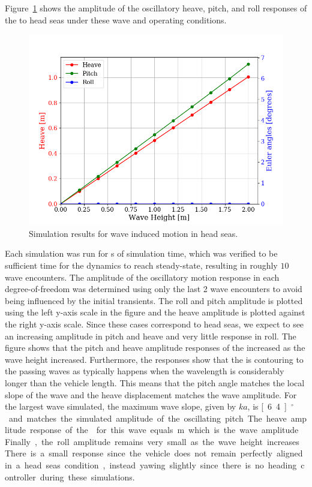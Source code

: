 \documentclass[utf8]{frontiersSCNS} %
\begin{document}
Figure~\ref{f:head_seas} shows the amplitude of the oscillatory heave, pitch, and roll responses of the \wamv{} to head seas under these wave and operating conditions.
\begin{figure}[h]
  \centering
  \includegraphics[width=\SFc\textwidth]{src/2020_08_25_head_seas_001.png}
  \caption{Simulation results for wave induced motion in head seas.}
  \label{f:head_seas}
\end{figure}
%
Each simulation was run for \unit[60]{s} of simulation time, which was verified to be sufficient time for the dynamics to reach steady-state, resulting in roughly $10$ wave encounters. The amplitude of the oscillatory motion response in each degree-of-freedom was determined using only the last 2 wave encounters to avoid being influenced by the initial transients. The roll and pitch amplitude is plotted using the left y-axis scale in the figure and the heave amplitude is plotted against the right y-axis scale. Since these cases correspond to head seas, we expect to see an increasing amplitude in pitch and heave and very little response in roll. The figure shows that the pitch and heave amplitude responses of the \wamv{} increased as the wave height increased. Furthermore, the responses show that the \wamv{} is contouring to the passing waves as typically happens when the wavelength is considerably longer than the vehicle length. This means that the pitch angle matches the local slope of the wave and the heave displacement matches the wave amplitude. For the largest wave simulated, the maximum wave slope, given by $ka$, is \unit[6.4]{$^\circ$} and matches the simulated amplitude of the oscillating pitch. The heave amplitude response of the \wamv{} for this wave equals \unit[1]{m} which is the wave amplitude. Finally, the roll amplitude remains very small as the wave height increases. There is a small response since the vehicle does not remain perfectly aligned in a head seas condition, instead yawing slightly since there is no heading controller during these simulations.
\end{document}
